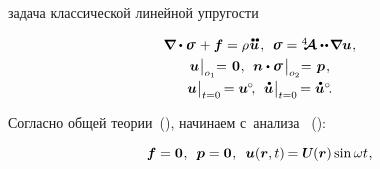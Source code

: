 \begin{otherlanguage}{russian}

 задача классической линейной упругости

\nopagebreak\vspace{-0.1em}\begin{equation}\label{classiclinearelasticity:problem}
\begin{array}{c}
\boldnabla \dotp \linearstress \hspace{.15ex} + \bm{f} = \rho \hspace{.1ex} \mathdotdotabove{\bm{u}} \hspace{.2ex} ,
\:\:
\linearstress = \stiffnesstensor \dotdotp \hspace{-0.25ex} \boldnabla {\bm{u}} \hspace{.1ex} ,
\\[.32em]
%
\bm{u} \hspace{.1ex} \bigr|_{o_1} \hspace{-0.64ex} = \hspace{.2ex} \bm{0} \hspace{.1ex},
\:\:
\bm{n} \dotp \linearstress \hspace{0.25ex} \bigr|_{o_2} \hspace{-0.64ex} = \hspace{.2ex} \bm{p} \hspace{.16ex} ,
\\[.4em]
%
\bm{u} \hspace{.1ex} \bigr|_{t=0} \hspace{-0.2ex} = \bm{u}^{\hspace{-0.1ex}\circ} \hspace{-0.4ex},
\:\:
\mathdotabove{\bm{u}} \hspace{.1ex} \bigr|_{t=0} \hspace{-0.2ex} = \mathdotabove{\bm{u}}^{\circ} \hspace{-0.4ex} .
\end{array}
\end{equation}

\vspace{.2em}
Согласно общей теории~(), начинаем с~анализа ~():

\nopagebreak\vspace{-0.25em}\begin{equation*}
\bm{f} = \bm{0} \hspace{.1ex} ,
\:\;
\bm{p} = \bm{0} \hspace{.1ex} ,
\:\;
\bm{u}(\locationvector, t) \hspace{-0.2ex} = \mathboldU(\locationvector) \operatorname{sin} \omega t
\hspace{.1ex} ,
\end{equation*}


\end{otherlanguage}
